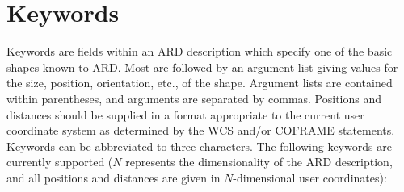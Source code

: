 \documentclass[11pt,nolof]{starlink}
\begin{document}
\section{\label{SEC:KEYW}Keywords}
Keywords are fields within an ARD description which specify one of the
basic shapes known to ARD. Most are followed by an argument list giving
values for the size, position, orientation, etc., of the shape. Argument
lists are contained within parentheses, and arguments are separated by
commas. Positions and distances should be supplied in a format
appropriate to the current user coordinate system as determined by the
WCS and/or COFRAME statements. Keywords can be abbreviated to three
characters. The following keywords are currently supported ($N$
represents the dimensionality of the ARD description, and all positions
and distances are given in $N$-dimensional user coordinates):
\end{document}

